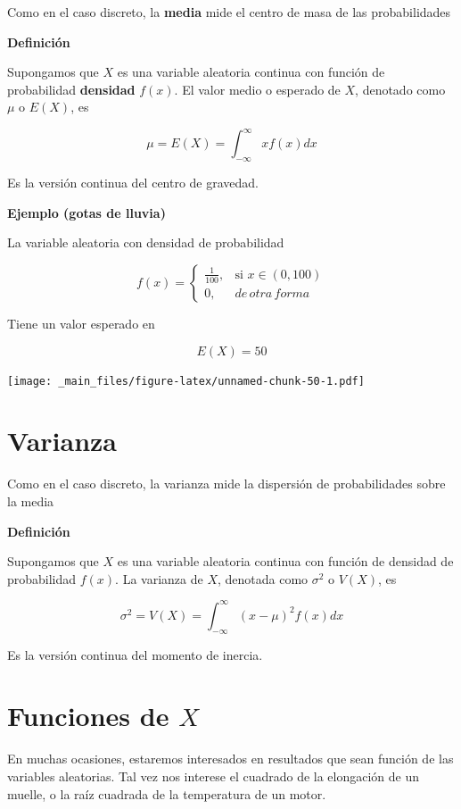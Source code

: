 \documentclass[
]{book}
\begin{document}
Como en el caso discreto, la \textbf{media} mide el centro de masa de las probabilidades

\textbf{Definición}

Supongamos que \(X\) es una variable aleatoria continua con función de probabilidad \textbf{densidad} \(f(x)\). El valor medio o esperado de \(X\), denotado como \(\mu\) o \(E(X)\), es

\[\mu=E(X)=\int_{-\infty}^\infty x f(x) dx\]

Es la versión continua del centro de gravedad.

\textbf{Ejemplo (gotas de lluvia)}

La variable aleatoria con densidad de probabilidad

\[
    f(x)= 
\begin{cases}
    \frac{1}{100},& \text{si } x\in (0,100)\\
    0,& de\, otra\, forma 
\end{cases}
\]

Tiene un valor esperado en

\[E(X)=50\]

\texttt{[image: \_main\_files/figure-latex/unnamed-chunk-50-1.pdf]}

\hypertarget{varianza-1}{%
\section{Varianza}\label{varianza-1}}

Como en el caso discreto, la varianza mide la dispersión de probabilidades sobre la media

\textbf{Definición}

Supongamos que \(X\) es una variable aleatoria continua con función de densidad de probabilidad \(f(x)\). La varianza de \(X\), denotada como \(\sigma^2\) o \(V(X)\), es

\[\sigma^2=V(X)=\int_{-\infty}^\infty (x-\mu)^2 f(x) dx\]

Es la versión continua del momento de inercia.

\hypertarget{funciones-de-x}{%
\section{\texorpdfstring{Funciones de \(X\)}{Funciones de X}}\label{funciones-de-x}}

En muchas ocasiones, estaremos interesados en resultados que sean función de las variables aleatorias. Tal vez nos interese el cuadrado de la elongación de un muelle, o la raíz cuadrada de la temperatura de un motor.
\end{document}
